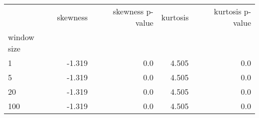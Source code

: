 \begin{tabular}{lrrrr}
\toprule
{} &  skewness &  skewness p-value &  kurtosis &  kurtosis p-value \\
window size &           &                   &           &                   \\
\midrule
1           &    -1.319 &               0.0 &     4.505 &               0.0 \\
5           &    -1.319 &               0.0 &     4.505 &               0.0 \\
20          &    -1.319 &               0.0 &     4.505 &               0.0 \\
100         &    -1.319 &               0.0 &     4.505 &               0.0 \\
\bottomrule
\end{tabular}
